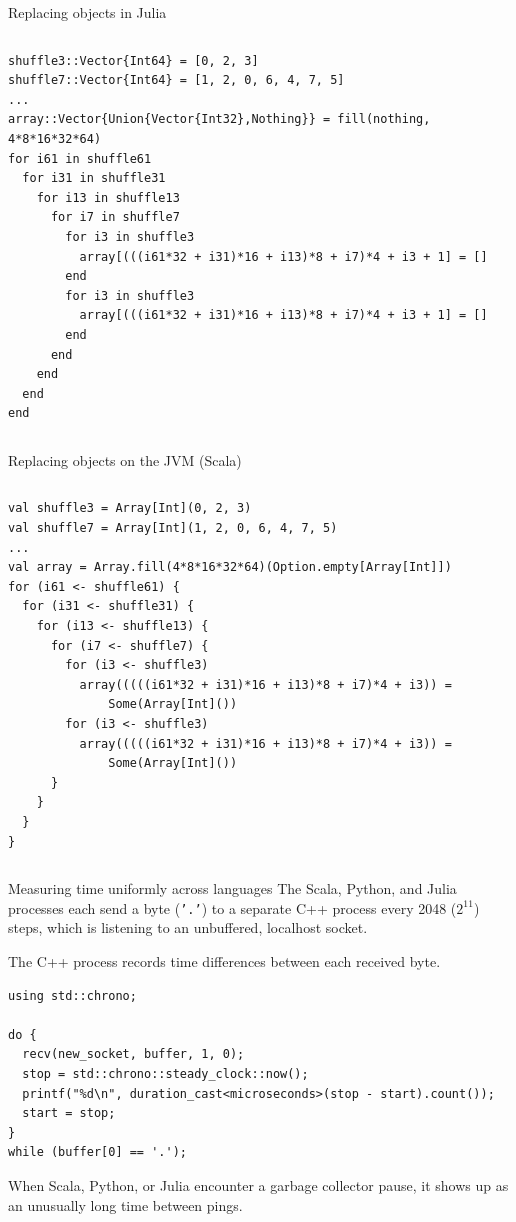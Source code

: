 \documentclass[aspectratio=169]{beamer}
\begin{document}
\begin{frame}[fragile]{Replacing objects in Julia}
\small
\begin{columns}
\begin{verbatim}
shuffle3::Vector{Int64} = [0, 2, 3]
shuffle7::Vector{Int64} = [1, 2, 0, 6, 4, 7, 5]
...
array::Vector{Union{Vector{Int32},Nothing}} = fill(nothing, 4*8*16*32*64)
for i61 in shuffle61
  for i31 in shuffle31
    for i13 in shuffle13
      for i7 in shuffle7
        for i3 in shuffle3
          array[(((i61*32 + i31)*16 + i13)*8 + i7)*4 + i3 + 1] = []
        end
        for i3 in shuffle3
          array[(((i61*32 + i31)*16 + i13)*8 + i7)*4 + i3 + 1] = []
        end
      end
    end
  end
end
\end{verbatim}
\end{columns}
\end{frame}

\begin{frame}[fragile]{Replacing objects on the JVM (Scala)}
\small
\begin{columns}
\begin{verbatim}
val shuffle3 = Array[Int](0, 2, 3)
val shuffle7 = Array[Int](1, 2, 0, 6, 4, 7, 5)
...
val array = Array.fill(4*8*16*32*64)(Option.empty[Array[Int]])
for (i61 <- shuffle61) {
  for (i31 <- shuffle31) {
    for (i13 <- shuffle13) {
      for (i7 <- shuffle7) {
        for (i3 <- shuffle3)
          array(((((i61*32 + i31)*16 + i13)*8 + i7)*4 + i3)) =
              Some(Array[Int]())
        for (i3 <- shuffle3)
          array(((((i61*32 + i31)*16 + i13)*8 + i7)*4 + i3)) =
              Some(Array[Int]())
      }
    }
  }
}
\end{verbatim}
\end{columns}
\end{frame}

\begin{frame}[fragile]{Measuring time uniformly across languages}
\vspace{0.3 cm}
The Scala, Python, and Julia processes each send a byte (\texttt{'.'}) to a separate C++ process every 2048 ($2^{11}$) steps, which is listening to an unbuffered, localhost socket.

\vspace{0.2 cm}
The C++ process records time differences between each received byte.

\small
\vspace{0.3 cm}
\begin{verbatim}
using std::chrono;

do {
  recv(new_socket, buffer, 1, 0);
  stop = std::chrono::steady_clock::now();
  printf("%d\n", duration_cast<microseconds>(stop - start).count());
  start = stop;
}
while (buffer[0] == '.');
\end{verbatim}

\normalsize
\vspace{0.3 cm}
When Scala, Python, or Julia encounter a garbage collector pause, it shows up as an unusually long time between pings.
\end{frame}
\end{document}
